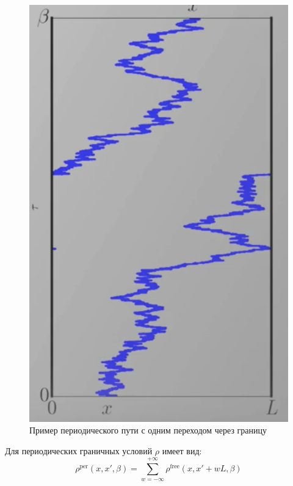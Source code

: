\begin{figure}
    \label{fig:periodic-path}
    \includegraphics[width=\linewidth]{fig/periodic-path}
    \caption{Пример периодического пути с одним переходом через границу}
\end{figure}

Для периодических граничных условий $\rho$ имеет вид:
\begin{equation}
    \label{eq:rho-periodic-boundary-definition}
    \rho^{\text{per}} (x, x', \beta) = \sum\limits_{w=-\infty}^{+\infty}\rho^{\text{free}} (x, x' + wL, \beta)
\end{equation}

